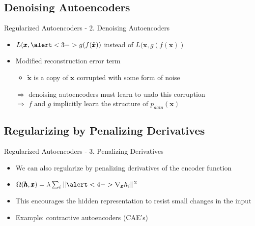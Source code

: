 \documentclass[handout]{beamer}
\begin{document}
\subsection{Denoising Autoencoders}
\begin{frame}[t]{Regularized Autoencoders - 2. Denoising Autoencoders}
    \begin{itemize}
        \pause
    \item $L(\pmb{x}, \alert<3->{g(f(\tilde{\pmb{x}})})$ instead of $L(\pmb{x}, g(f(\pmb{x}))$   
        \pause
        \item Modified reconstruction error term
            \pause
        \begin{itemize}
        \item $\widetilde{\pmb{x}}$ is a copy of $\pmb{x}$ corrupted with some form of noise\\
        \end{itemize}
            \pause
            $\Rightarrow$ denoising autoencoders must learn to undo this corruption\\
            \pause
            $\Rightarrow$ $f$ and $g$ implicitly learn the structure of $p_{data}(\pmb{x})$
    \end{itemize}
\end{frame}


\subsection{Regularizing by Penalizing Derivatives}
\begin{frame}[t]{Regularized Autoencoders - 3. Penalizing Derivatives}
\begin{itemize}
    \pause
        \item We can also regularize by penalizing derivatives of the encoder function
            \pause
              \item $\Omega(\pmb{h},\pmb{x}) = \lambda \sum_i ||\alert<4->{\nabla_{\pmb{x}} h_i} ||^2$
               \pause 
               \pause
            \item This encourages the hidden representation to resist small changes in the input
                \pause
            \item Example: contractive autoencoders (CAE's)
\end{itemize}    
\end{frame}
\end{document}
